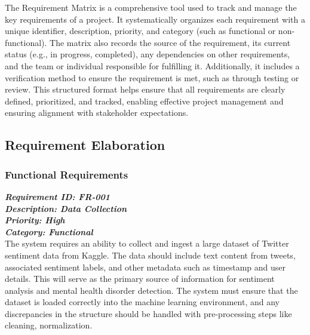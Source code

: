 \noindent
The Requirement Matrix is a comprehensive tool used to track and manage the key requirements of a project. It systematically organizes each requirement with a unique identifier, description, priority, and category (such as functional or non-functional). The matrix also records the source of the requirement, its current status (e.g., in progress, completed), any dependencies on other requirements, and the team or individual responsible for fulfilling it. Additionally, it includes a verification method to ensure the requirement is met, such as through testing or review. This structured format helps ensure that all requirements are clearly defined, prioritized, and tracked, enabling effective project management and ensuring alignment with stakeholder expectations.

\subsection{Requirement Elaboration}


\subsubsection{Functional Requirements}

\noindent
\textbf{\emph{Requirement ID: FR-001}} \\ 
\textbf{\emph{Description: Data Collection}} \\
\textbf{\emph{Priority: High}} \\
\textbf{\emph{Category: Functional}} \\
\noindent
The system requires an ability to collect and ingest a large dataset of Twitter sentiment data from Kaggle. The data should include text content from tweets, associated sentiment labels, and other metadata such as timestamp and user details. This will serve as the primary source of information for sentiment analysis and mental health disorder detection. The system must ensure that the dataset is loaded correctly into the machine learning environment, and any discrepancies in the structure should be handled with pre-processing steps like cleaning, normalization. \\

